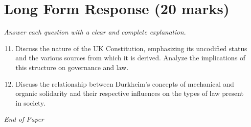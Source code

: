 \documentclass[12pt]{article}
\begin{document}
\section*{Long Form Response (20 marks)}
\textit{Answer each question with a clear and complete explanation.}
\begin{enumerate}[label=\arabic*.]
\setcounter{enumi}{10}
\item Discuss the nature of the UK Constitution, emphasizing its uncodified status and the various sources from which it is derived. Analyze the implications of this structure on governance and law.
\item Discuss the relationship between Durkheim's concepts of mechanical and organic solidarity and their respective influences on the types of law present in society.
\end{enumerate}

\vfill
\noindent\textit{End of Paper}
\end{document}
